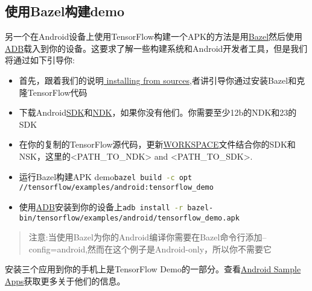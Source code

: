 \subsection{使用Bazel构建demo}
另一个在Android设备上使用TensorFlow构建一个APK的方法是用\href{https://bazel.build/}{Bazel}然后使用\href{https://developer.android.com/studio/command-line/adb.html?hl=zh-cn}{ADB}载入到你的设备。这要求了解一些构建系统和Android开发者工具，但是我们将通过如下引导你:
\begin{itemize}
\item 首先，跟着我们的说明\href{https://www.tensorflow.org/install/install_sources?hl=zh-cn}{ installing from sources},者讲引导你通过安装Bazel和克隆TensorFlow代码
\item 下载Android\href{https://developer.android.com/studio/index.html?hl=zh-cn}{SDK}和\href{https://developer.android.com/ndk/downloads/index.html?hl=zh-cn}{NDK}，如果你没有他们。你需要至少12b的NDK和23的SDK
\item 在你的复制的TensorFlow源代码，更新\href{https://github.com/tensorflow/tensorflow/blob/master/WORKSPACE}{WORKSPACE}文件结合你的SDK和NSK，这里的<PATH\_TO\_NDK> and <PATH\_TO\_SDK>.
\item 运行Bazel构建APK demo\lstinline[language=Bash]{bazel build -c opt //tensorflow/examples/android:tensorflow_demo}
\item 使用\href{https://developer.android.com/studio/command-line/adb.html?hl=zh-cn#move}{ADB}安装到你的设备上\lstinline[language=Bash]{adb install -r bazel-bin/tensorflow/examples/android/tensorflow_demo.apk}
\end{itemize}
\begin{quote}
注意:当使用Bazel为你的Android编译你需要在Bazel命令行添加--config=android,然而在这个例子是Android-only，所以你不需要它
\end{quote}
安装三个应用到你的手机上是TensorFlow Demo的一部分。查看\href{https://www.tensorflow.org/mobile/android_build?hl=zh-cn#android_sample_apps}{Android Sample Apps}获取更多关于他们的信息。
